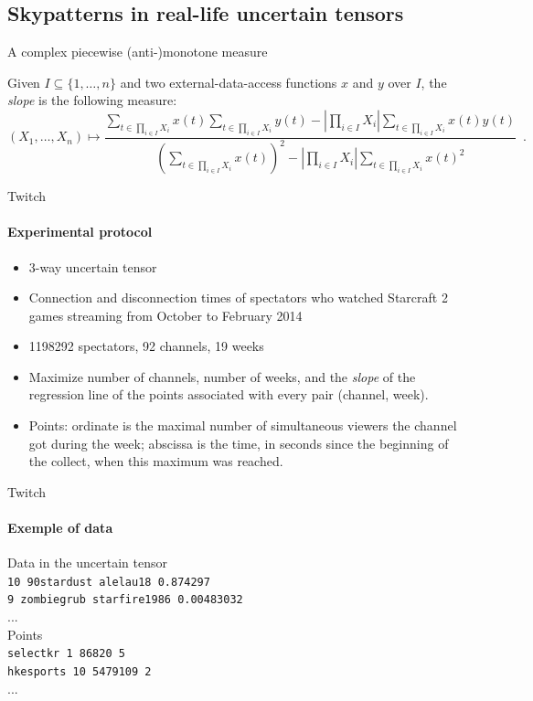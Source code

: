 \documentclass{beamer}
\begin{document}
\subsection{Skypatterns in real-life uncertain tensors}

\begin{frame}{A complex piecewise (anti-)monotone measure}
\begin{definition}[Slope]
  \label{def:slope}
  Given $I \subseteq \{1, \dots, n\}$ and two external-data-access
  functions $x$ and $y$ over $I$, the \emph{slope} is the following
  measure:
  \begin{displaymath}
    (X_1, \dots, X_n) \mapsto \frac{\displaystyle\sum_{t \in \prod_{i
          \in I} X_i} x(t) \sum_{t \in \prod_{i \in I} X_i} y(t) -
      \left|\prod_{i \in I} X_i\right|\sum_{t \in \prod_{i \in I} X_i}
      x(t)y(t)}{\displaystyle\left(\sum_{t \in \prod_{i \in I} X_i}
        x(t)\right)^2 - \left|\prod_{i \in I} X_i\right|\sum_{t \in
        \prod_{i \in I}X_i} x(t)^2} \enspace .
  \end{displaymath}
\end{definition}
\end{frame}

\begin{frame}{Twitch}
  \framesubtitle{Experimental protocol}
  \begin{itemize}
      \item 3-way uncertain tensor
      \item Connection and disconnection times of spectators who watched Starcraft 2 games streaming from October to February 2014
      \item 1198292 spectators, 92 channels, 19 weeks
      \item Maximize number of channels, number of weeks, and the \emph{slope} of the regression line of the points associated with every pair (channel, week).
      \item Points: ordinate is the maximal number of simultaneous viewers the
channel got during the week; abscissa is the time, in seconds since the
beginning of the collect, when this maximum was reached.
  \end{itemize}

\end{frame}

\begin{frame}{Twitch}
  \framesubtitle{Exemple of data}
  Data in the uncertain tensor\\
  \texttt{10 90stardust alelau18 0.874297}\\
  \texttt{9 zombiegrub starfire1986 0.00483032}\\
  ...\\
  Points\\
  \texttt{selectkr 1 86820 5}\\
  \texttt{hkesports 10 5479109 2}\\
  ...
\end{frame}
\end{document}
